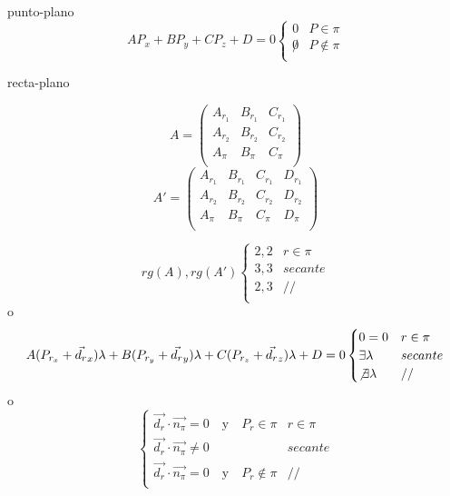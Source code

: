 \documentclass[12pt, letterpaper, twoside]{article}
\begin{document}
	punto-plano
	\begin{equation}
		A P_x + B P_y + C P_z + D = 0
		\begin{cases}
			0     & P \in \pi     \\
			\not0 & P \not\in \pi \\
		\end{cases}
	\end{equation}

	\pagebreak
	recta-plano
	\begin{multicols}{2}
		\noindent
		\begin{equation}
			A =
			\begin{pmatrix}
				A_{r_1} & B_{r_1} & C_{r_1} \\
				A_{r_2} & B_{r_2} & C_{r_2} \\
				A_\pi   & B_\pi   & C_\pi   \\
			\end{pmatrix}
		\end{equation}
		\begin{equation}
			A' =
			\begin{pmatrix}
				A_{r_1} & B_{r_1} & C_{r_1} & D_{r_1} \\
				A_{r_2} & B_{r_2} & C_{r_2} & D_{r_2} \\
				A_\pi   & B_\pi   & C_\pi   & D_\pi   \\
			\end{pmatrix}
		\end{equation}
	\end{multicols}
	\begin{equation}
		rg(A), rg(A')
		\begin{cases}
			2, 2 & r  \in \pi  \\
			3, 3 & secante     \\
			2, 3 & //          \\
		\end{cases}
	\end{equation}
	o
	\begin{equation}
		A (P_{r_x} + \vec{d_r}_x) \lambda + B (P_{r_y} + \vec{d_r}_y) \lambda + C (P_{r_z} + \vec{d_r}_z) \lambda + D = 0
		\begin{cases}
			0=0                 & r \in \pi   \\
			\exists\lambda      & secante     \\
			\not\exists\lambda  & //          \\
		\end{cases}
	\end{equation}
	o
	\begin{equation}
		\begin{cases}
			\vec{d_r} \cdot \vec{n_\pi} = 0 \quad \text{y} \quad P_r \in \pi       & r \in \pi   \\
			\vec{d_r} \cdot \vec{n_\pi} \not= 0                 & secante     \\
			\vec{d_r} \cdot \vec{n_\pi} = 0 \quad \text{y} \quad P_r \not\in \pi   & //          \\
		\end{cases}
	\end{equation}
	
\end{document}
